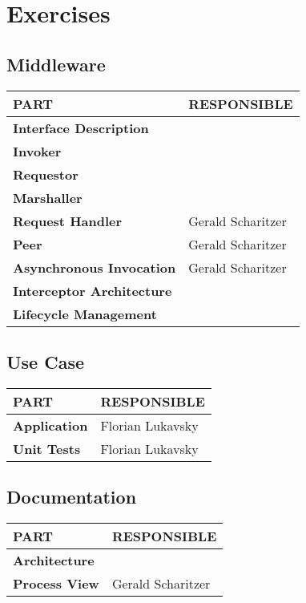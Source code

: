 \documentclass[a4paper]{article}
\begin{document}
\pagestyle{empty}
\section*{Exercises}
\vspace{0.5cm}
\subsection*{Middleware}

\begin{small}
\begin{tabular}{| p{4cm} | p{9cm} |}\hline
\textbf{PART} & \textbf{RESPONSIBLE}\\\hline\hline
\textbf{Interface Description} & \\\hline
\textbf{Invoker} & \\\hline
\textbf{Requestor} & \\\hline
\textbf{Marshaller} & \\\hline
\textbf{Request Handler} & Gerald Scharitzer\\\hline
\textbf{Peer} & Gerald Scharitzer\\\hline
\textbf{Asynchronous Invocation} & Gerald Scharitzer\\\hline
\textbf{Interceptor Architecture} & \\\hline
\textbf{Lifecycle Management} & \\\hline\hline
\end{tabular}
\end{small}

\vspace{1cm}

\subsection*{Use Case}

\begin{small}
\begin{tabular}{| p{4cm} | p{9cm} |}\hline
\textbf{PART} & \textbf{RESPONSIBLE}\\\hline\hline
\textbf{Application} & Florian Lukavsky\\\hline
\textbf{Unit Tests} & Florian Lukavsky\\\hline
\end{tabular}
\end{small}


\vspace{1cm}

\subsection*{Documentation}

\begin{small}
\begin{tabular}{| p{4cm} | p{9cm} |}\hline
\textbf{PART} & \textbf{RESPONSIBLE}\\\hline\hline
\textbf{Architecture} & \\\hline
\textbf{Process View} & Gerald Scharitzer\\\hline
\end{tabular}
\end{small}
\end{document}
